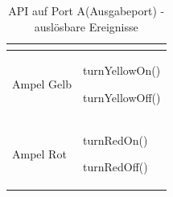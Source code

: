 \documentclass[a4paper, 11pt]{article}
\begin{document}
\begin{table}[h]
\begin{tabularx}{\textwidth}{|X|X|}
\begin{compactenum}[]
           \end{compactenum}\\
\hline
Ampel Gelb&\begin{compactenum}[]
           \item \ttfamily turnYellowOn()
           \item \ttfamily turnYellowOff()
           \end{compactenum}\\
\hline
Ampel Rot&\begin{compactenum}[]
           \item \ttfamily turnRedOn()
           \item \ttfamily turnRedOff()
           \end{compactenum}\\
\hline
\end{tabularx}
\caption{API auf Port A(Ausgabeport) - auslösbare Ereignisse}
\label{portA}
\end{table}

\newpage
\end{document}
